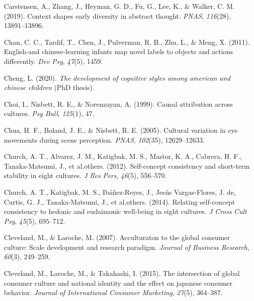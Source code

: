 \documentclass[
  man,floatsintext]{apa6}
\newlength{\cslhangindent}
\newlength{\cslentryspacingunit} %
\newenvironment{CSLReferences}[2] %
 {%
  \setlength{\parindent}{0pt}
  \ifodd #1
  \let\oldpar\par
  \def\par{\hangindent=\cslhangindent\oldpar}
  \fi
  \setlength{\parskip}{#2\cslentryspacingunit}
 }%
 {}
\begin{document}
\begin{CSLReferences}{1}{0}
\leavevmode{}%
Carstensen, A., Zhang, J., Heyman, G. D., Fu, G., Lee, K., \& Walker, C. M. (2019). Context shapes early diversity in abstract thought. \emph{PNAS}, \emph{116}(28), 13891--13896.

\leavevmode{}%
Chan, C. C., Tardif, T., Chen, J., Pulverman, R. B., Zhu, L., \& Meng, X. (2011). English-and chinese-learning infants map novel labels to objects and actions differently. \emph{Dev Psy}, \emph{47}(5), 1459.

\leavevmode{}%
Cheng, L. (2020). \emph{The development of cognitive styles among american and chinese children} (PhD thesis).

\leavevmode{}%
Choi, I., Nisbett, R. E., \& Norenzayan, A. (1999). Causal attribution across cultures. \emph{Psy Bull}, \emph{125}(1), 47.

\leavevmode{}%
Chua, H. F., Boland, J. E., \& Nisbett, R. E. (2005). Cultural variation in eye movements during scene perception. \emph{PNAS}, \emph{102}(35), 12629--12633.

\leavevmode{}%
Church, A. T., Alvarez, J. M., Katigbak, M. S., Mastor, K. A., Cabrera, H. F., Tanaka-Matsumi, J., et al.others. (2012). Self-concept consistency and short-term stability in eight cultures. \emph{J Res Pers}, \emph{46}(5), 556--570.

\leavevmode{}%
Church, A. T., Katigbak, M. S., Ibáñez-Reyes, J., Jesús Vargas-Flores, J. de, Curtis, G. J., Tanaka-Matsumi, J., et al.others. (2014). Relating self-concept consistency to hedonic and eudaimonic well-being in eight cultures. \emph{J Cross Cult Psy}, \emph{45}(5), 695--712.

\leavevmode{}%
Cleveland, M., \& Laroche, M. (2007). Acculturaton to the global consumer culture: Scale development and research paradigm. \emph{Journal of Business Research}, \emph{60}(3), 249--259.

\leavevmode{}%
Cleveland, M., Laroche, M., \& Takahashi, I. (2015). The intersection of global consumer culture and national identity and the effect on japanese consumer behavior. \emph{Journal of International Consumer Marketing}, \emph{27}(5), 364--387.


\end{CSLReferences}
\end{document}
